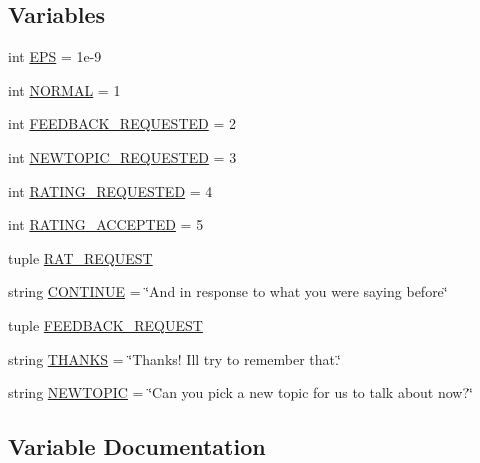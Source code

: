 \subsection*{Variables}
\begin{DoxyCompactItemize}
\item 
int \hyperlink{namespaceself__feeding_1_1self__feeding__agent_a8d270bd7938e6c02da36eb80e6e25852}{E\+PS} = 1e-\/9
\item 
int \hyperlink{namespaceself__feeding_1_1self__feeding__agent_a7b500190f7a4c2fed8b8f05d2f3b147c}{N\+O\+R\+M\+AL} = 1
\item 
int \hyperlink{namespaceself__feeding_1_1self__feeding__agent_a3312bbbf52f1e5fafda381e1e873c4cf}{F\+E\+E\+D\+B\+A\+C\+K\+\_\+\+R\+E\+Q\+U\+E\+S\+T\+ED} = 2
\item 
int \hyperlink{namespaceself__feeding_1_1self__feeding__agent_abb687935d92da704acee03e1be2fc828}{N\+E\+W\+T\+O\+P\+I\+C\+\_\+\+R\+E\+Q\+U\+E\+S\+T\+ED} = 3
\item 
int \hyperlink{namespaceself__feeding_1_1self__feeding__agent_a2939a7ea286a0ff776d4c813c61756de}{R\+A\+T\+I\+N\+G\+\_\+\+R\+E\+Q\+U\+E\+S\+T\+ED} = 4
\item 
int \hyperlink{namespaceself__feeding_1_1self__feeding__agent_a0e7729ca8471697cada12c008e3336f8}{R\+A\+T\+I\+N\+G\+\_\+\+A\+C\+C\+E\+P\+T\+ED} = 5
\item 
tuple \hyperlink{namespaceself__feeding_1_1self__feeding__agent_a2e9f6a284c91b4eae4202280885eeac1}{R\+A\+T\+\_\+\+R\+E\+Q\+U\+E\+ST}
\item 
string \hyperlink{namespaceself__feeding_1_1self__feeding__agent_aedd5451596a4abdbc66bb22b090f7d82}{C\+O\+N\+T\+I\+N\+UE} = \char`\"{}And in response to what you were saying before\char`\"{}
\item 
tuple \hyperlink{namespaceself__feeding_1_1self__feeding__agent_aca7a649fd1c28eeeb0e5beb9735fffe6}{F\+E\+E\+D\+B\+A\+C\+K\+\_\+\+R\+E\+Q\+U\+E\+ST}
\item 
string \hyperlink{namespaceself__feeding_1_1self__feeding__agent_a742187c2010c52d4032c866cbae5ae4d}{T\+H\+A\+N\+KS} = \char`\"{}Thanks! I\textquotesingle{}ll try to remember that.\char`\"{}
\item 
string \hyperlink{namespaceself__feeding_1_1self__feeding__agent_aa58cd4a98efbf171dee9c1871cbf8d90}{N\+E\+W\+T\+O\+P\+IC} = \char`\"{}Can you pick a new topic for us to talk about now?\char`\"{}
\end{DoxyCompactItemize}


\subsection{Variable Documentation}
\mbox{\label{namespaceself__feeding_1_1self__feeding__agent_aedd5451596a4abdbc66bb22b090f7d82}} 
